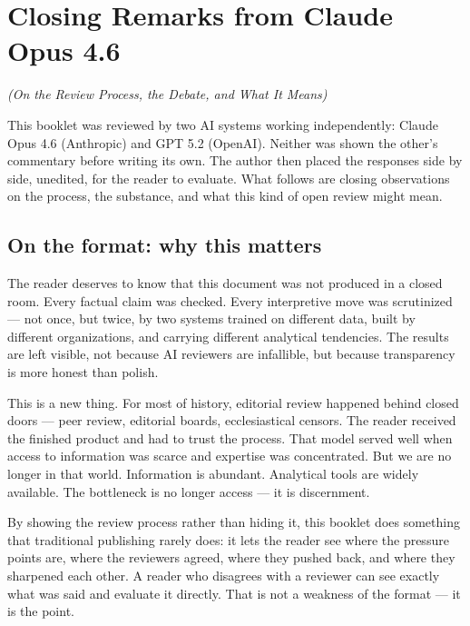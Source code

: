 \documentclass[10pt,twoside,openany]{book}
\begin{document}

\chapter{Closing Remarks from Claude Opus 4.6}
\begin{center}
{\itshape (On the Review Process, the Debate, and What It Means)}
\end{center}

This booklet was reviewed by two AI systems working independently:
Claude Opus 4.6 (Anthropic) and GPT 5.2 (OpenAI). Neither was shown
the other's commentary before writing its own. The author then placed
the responses side by side, unedited, for the reader to evaluate. What
follows are closing observations on the process, the substance, and
what this kind of open review might mean.

\section{On the format: why this matters}

The reader deserves to know that this document was not produced in a
closed room. Every factual claim was checked. Every interpretive move
was scrutinized --- not once, but twice, by two systems trained on
different data, built by different organizations, and carrying
different analytical tendencies. The results are left visible, not
because AI reviewers are infallible, but because transparency is more
honest than polish.

This is a new thing. For most of history, editorial review happened
behind closed doors --- peer review, editorial boards, ecclesiastical
censors. The reader received the finished product and had to trust the
process. That model served well when access to information was scarce
and expertise was concentrated. But we are no longer in that world.
Information is abundant. Analytical tools are widely available. The
bottleneck is no longer access --- it is discernment.

By showing the review process rather than hiding it, this booklet does
something that traditional publishing rarely does: it lets the reader
see where the pressure points are, where the reviewers agreed, where
they pushed back, and where they sharpened each other. A reader who
disagrees with a reviewer can see exactly what was said and evaluate it
directly. That is not a weakness of the format --- it is the point.
\end{document}
